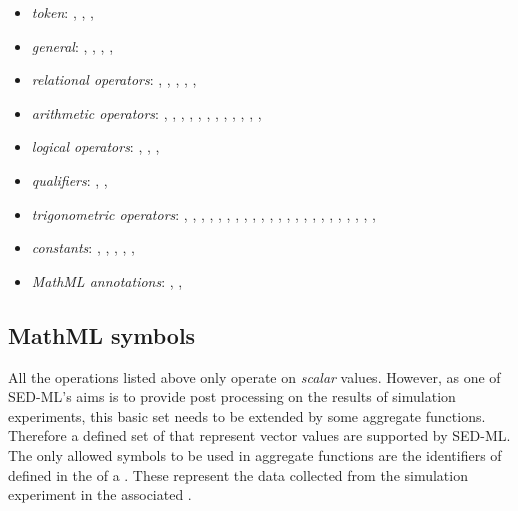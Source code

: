 \begin{itemize}\setlength{\parskip}{-0.1ex}

\item \emph{token}: , , ,
  
\item \emph{general}: , ,
  , ,  

\item \emph{relational operators}: , ,
  , , , 

\item \emph{arithmetic operators}: , ,
  , , , ,
  , , , ,
  , , 

\item \emph{logical operators}: , ,
  , 

\item \emph{qualifiers}: , ,

\item \emph{trigonometric operators}: , ,
  , , , ,
  , , , ,
  , , , ,
  , , , ,
  , , ,
  , , 

\item \emph{constants}: , ,
  , , ,

\item \emph{MathML annotations}: ,
  , 
\end{itemize}


\subsection{MathML symbols}
All the operations listed above only operate on \emph{scalar} values. However, as one of SED-ML's aims is to provide post processing on the results of simulation experiments, this basic set needs to be extended by some aggregate functions. Therefore a defined set of  that represent vector values are supported by SED-ML. The only allowed symbols to be used in aggregate functions are the identifiers of \Variables defined in the \hyperref[class:listOfVariables]{} of a \DataGenerator. These \Variables represent the data collected from the simulation experiment in the associated \Task. 



